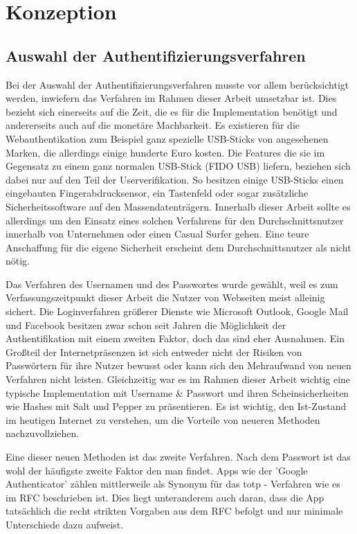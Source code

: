 \chapter{Konzeption}
\section{Auswahl der Authentifizierungsverfahren}
Bei der Auswahl der Authentifizierungsverfahren musste vor allem berücksichtigt werden, inwiefern das Verfahren im Rahmen dieser Arbeit umsetzbar ist. Dies bezieht sich einerseits auf die Zeit, die es für die Implementation benötigt und andererseits auch auf die monetäre Machbarkeit. Es existieren für die Webauthentikation zum Beispiel ganz spezielle USB-Sticks von angesehenen Marken, die allerdings einige hunderte Euro kosten. Die Features die sie im Gegensatz zu einem ganz normalen USB-Stick (FIDO USB) liefern, beziehen sich dabei nur auf den Teil der Userverifikation. So besitzen einige USB-Sticks einen eingebauten Fingerabdrucksensor, ein Tastenfeld oder sogar zusätzliche Sicherheitssoftware auf den Massendatenträgern. Innerhalb dieser Arbeit sollte es allerdings um den Einsatz eines solchen Verfahrens für den Durchschnittsnutzer innerhalb von Unternehmen oder einen Casual Surfer gehen. Eine teure Anschaffung für die eigene Sicherheit erscheint dem Durchschnittsnutzer als nicht nötig.

Das Verfahren des Usernamen und des Passwortes wurde gewählt, weil es zum Verfassungszeitpunkt dieser Arbeit die Nutzer von Webseiten meist alleinig sichert. Die Loginverfahren größerer Dienste wie Microsoft Outlook, Google Mail und Facebook besitzen zwar schon seit Jahren die Möglichkeit der Authentifikation mit einem zweiten Faktor, doch das sind eher Ausnahmen. Ein Großteil der Internetpräsenzen ist sich entweder nicht der Risiken von Passwörtern für ihre Nutzer bewusst oder kann sich den Mehraufwand von neuen Verfahren nicht leisten. Gleichzeitig war es im Rahmen dieser Arbeit wichtig eine typische Implementation mit Username \& Passwort und ihren Scheinsicherheiten wie Hashes mit Salt und Pepper zu präsentieren. Es ist wichtig, den Ist-Zustand im heutigen Internet zu verstehen, um die Vorteile von neueren Methoden nachzuvollziehen.

Eine dieser neuen Methoden ist das zweite Verfahren. Nach dem Passwort ist das wohl der häufigste zweite Faktor den man findet. Apps wie der 'Google Authenticator' zählen mittlerweile als Synonym für das \ac{totp} - Verfahren wie es im RFC beschrieben ist. Dies liegt unteranderem auch daran, dass die App tatsächlich die recht strikten Vorgaben aus dem RFC befolgt und nur minimale Unterschiede dazu aufweist.
\newpage


